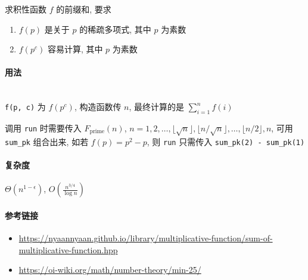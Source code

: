 求积性函数 \(f\) 的前缀和, 要求

\begin{enumerate}
    \item \(f(p)\) 是关于 \(p\) 的稀疏多项式, 其中 \(p\) 为素数
    \item \(f\left(p^c\right)\) 容易计算, 其中 \(p\) 为素数
\end{enumerate}

\paragraph{用法}~\\

\verb|f(p, c)| 为 \(f\left(p^c\right)\), 构造函数传 \(n\), 最终计算的是 \(\sum_{i=1}^n f(i)\)

调用 \verb|run| 时需要传入 \(F_{\text{prime}}(n)\), \(n=1,2,\dots,\lfloor\sqrt{n}\rfloor,\lfloor n/\sqrt{n}\rfloor,\dots,\lfloor n/2\rfloor,n\), 可用 \verb|sum_pk| 组合出来, 如若 \(f(p)=p^2-p\), 则 \verb|run| 只需传入 \verb|sum_pk(2) - sum_pk(1)|

\paragraph{复杂度}

\(\Theta\left(n^{1-\epsilon}\right)\), \(O\left(\frac{n^{3/4}}{\log n}\right)\)

\paragraph{参考链接}

\begin{itemize}
    \item \url{https://nyaannyaan.github.io/library/multiplicative-function/sum-of-multiplicative-function.hpp}
    \item \url{https://oi-wiki.org/math/number-theory/min-25/}
\end{itemize}
